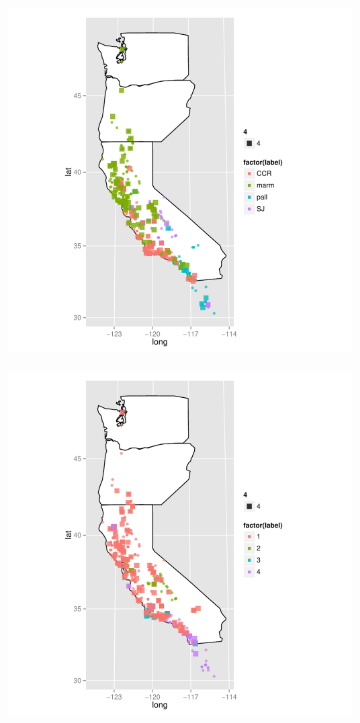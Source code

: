 \documentclass{article}\usepackage{graphicx, color}
\begin{document}
\begin{figure}[t]
  \begin{subfigure}[b]{0.5\textwidth}
    \centering
    \caption{}
    \includegraphics[width = \textwidth]{figure/rf-map3}
    \label{fig:rf-map3}
  \end{subfigure}%
  \begin{subfigure}[b]{0.5\textwidth}
    \centering
    \caption{}
    \includegraphics[width = \textwidth]{figure/rf-map4}

\end{subfigure}
\end{figure}
\end{document}

